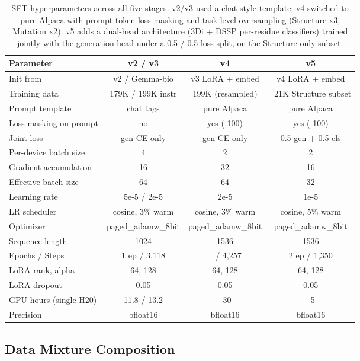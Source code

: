 \documentclass[11pt]{article}
\begin{document}
\begin{table}[H]
\centering
\caption{SFT hyperparameters across all five stages. v2/v3 used a chat-style template; v4 switched to pure Alpaca with prompt-token loss masking and task-level oversampling (Structure x3, Mutation x2). v5 adds a dual-head architecture (3Di + DSSP per-residue classifiers) trained jointly with the generation head under a 0.5 / 0.5 loss split, on the Structure-only subset.}
\begin{tabular}{lccc}
\toprule
\textbf{Parameter} & \textbf{v2 / v3} & \textbf{v4} & \textbf{v5} \\
\midrule
Init from & v2 / Gemma-bio & v3 LoRA + embed & v4 LoRA + embed \\
Training data & 179K / 199K instr & 199K (resampled) & ~21K Structure subset \\
Prompt template & chat tags & pure Alpaca & pure Alpaca \\
Loss masking on prompt & no & yes (-100) & yes (-100) \\
Joint loss & gen CE only & gen CE only & 0.5 gen + 0.5 cls \\
Per-device batch size & 4 & 2 & 2 \\
Gradient accumulation & 16 & 32 & 16 \\
Effective batch size & 64 & 64 & 32 \\
Learning rate & 5e-5 / 2e-5 & 2e-5 & 1e-5 \\
LR scheduler & cosine, 3\% warm & cosine, 3\% warm & cosine, 5\% warm \\
Optimizer & paged\_adamw\_8bit & paged\_adamw\_8bit & paged\_adamw\_8bit \\
Sequence length & 1024 & 1536 & 1536 \\
Epochs / Steps & 1 ep / 3,118 & ~ / 4,257 & 2 ep / 1,350 \\
LoRA rank, alpha & 64, 128 & 64, 128 & 64, 128 \\
LoRA dropout & 0.05 & 0.05 & 0.05 \\
GPU-hours (single H20) & 11.8 / 13.2 & ~30 & ~5 \\
Precision & bfloat16 & bfloat16 & bfloat16 \\
\bottomrule
\end{tabular}
\end{table}

\subsection{Data Mixture Composition}
\end{document}
